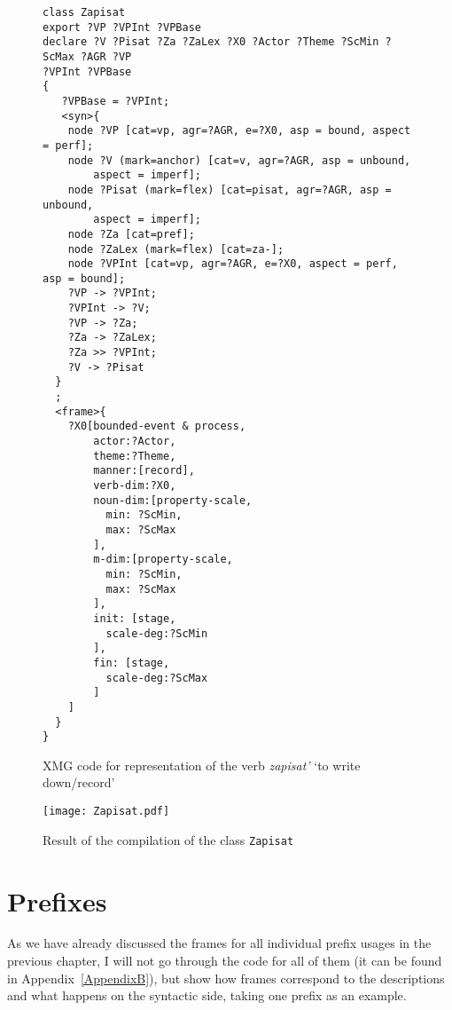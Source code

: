 \begin{figure}
\begin{lstlisting}[style=xmg,basicstyle=\footnotesize\ttfamily]
class Zapisat
export ?VP ?VPInt ?VPBase
declare ?V ?Pisat ?Za ?ZaLex ?X0 ?Actor ?Theme ?ScMin ?ScMax ?AGR ?VP 
?VPInt ?VPBase
{
   ?VPBase = ?VPInt;
   <syn>{
    node ?VP [cat=vp, agr=?AGR, e=?X0, asp = bound, aspect = perf];
    node ?V (mark=anchor) [cat=v, agr=?AGR, asp = unbound, 
    	aspect = imperf];
    node ?Pisat (mark=flex) [cat=pisat, agr=?AGR, asp = unbound, 
    	aspect = imperf];
    node ?Za [cat=pref];
    node ?ZaLex (mark=flex) [cat=za-];
    node ?VPInt [cat=vp, agr=?AGR, e=?X0, aspect = perf, asp = bound];
    ?VP -> ?VPInt;
    ?VPInt -> ?V;
    ?VP -> ?Za;
    ?Za -> ?ZaLex;
    ?Za >> ?VPInt;
    ?V -> ?Pisat
  }
  ;
  <frame>{
    ?X0[bounded-event & process,
        actor:?Actor,
        theme:?Theme,
        manner:[record],
        verb-dim:?X0,
        noun-dim:[property-scale,
          min: ?ScMin,
          max: ?ScMax
        ],
        m-dim:[property-scale,
          min: ?ScMin,
          max: ?ScMax
        ],
        init: [stage, 
          scale-deg:?ScMin
        ],
        fin: [stage, 
          scale-deg:?ScMax
        ]
    ]
  }
}

\end{lstlisting}
\caption{XMG code for representation of the verb \textit{zapisat'} `to write down/record' \label{xmg:zapisat}}
\end{figure}

\begin{sidewaysfigure}
\texttt{[image: Zapisat.pdf]}
\caption{Result of the compilation of the class \texttt{Zapisat}\label{fig:zapisat}}
\end{sidewaysfigure}

\section{Prefixes}
As we have already discussed the frames for all individual prefix usages in the previous chapter, I will not go through the code for all of them (it can be found in Appendix~\ref{AppendixB}), but show how frames correspond to the  descriptions and what happens on the syntactic side, taking one prefix as an example.

